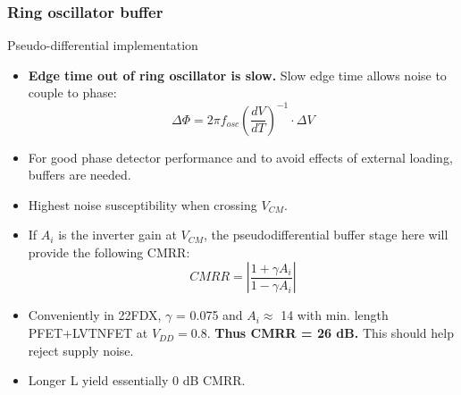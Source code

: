 \documentclass[t, screen, aspectratio=43]{beamer}
\begin{document}
\begin{frame}
	\frametitle{Ring oscillator buffer}
	\begin{block}{Pseudo-differential implementation}
		\begin{minipage}{6cm}
			\vspace{1em}
			\tiny

			\begin{itemize}[itemsep=4pt,label=\protect---]
				\item \textbf{Edge time out of ring oscillator is slow.} Slow edge time allows noise to couple to phase:
				\begin{equation}
					\Delta \Phi = 2\pi f_{osc}\left(\frac{dV}{dT}\right)^{-1}\cdot\Delta V
				\end{equation}
				\item For good phase detector performance and to avoid effects of external loading, buffers are needed.
				\item Highest noise susceptibility when crossing $V_{CM}$.
				\item If $A_i$ is the inverter gain at $V_{CM}$, the pseudodifferential buffer stage here will provide the following CMRR:
				\begin{equation}
				CMRR = \left|\frac{1+\gamma A_i}{1-\gamma A_i}\right|
				\end{equation}
				\item Conveniently in 22FDX, $\gamma$ = 0.075 and $A_i \approx$ 14 with min. length PFET+LVTNFET at $V_{DD}=0.8$. \textbf{Thus CMRR = 26 dB.} This should help reject supply noise.
				\item Longer L yield essentially 0 dB CMRR. 


\end{itemize}
\end{minipage}
\end{block}
\end{frame}
\end{document}
